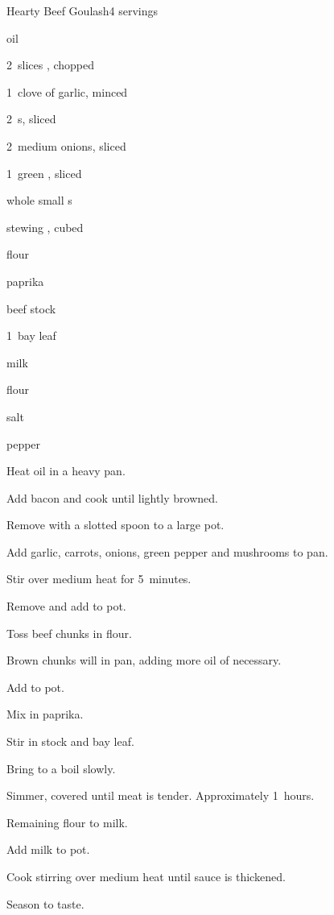 \begin{recipe}{Hearty Beef Goulash}{}{4 servings}

\begin{ingredients}
\item {} oil
\item 2~slices , chopped 
\item 1~clove of garlic, minced 
\item 2~s, sliced 
\item 2~medium onions, sliced 
\item 1~green , sliced 
\item \lbs{\quarter} whole small s
\item \lbs{1\half} stewing , cubed 
\item \C{\quarter} flour
\item {} paprika
\item {} beef stock
\item 1~bay leaf
\item {} milk
\item {} flour
\item salt
\item pepper
\end{ingredients}

\begin{directions}
\item Heat oil in a heavy pan.
\item Add bacon and cook until lightly browned.
\item Remove with a slotted spoon to a large pot.
\item Add garlic, carrots, onions, green pepper and mushrooms to pan.
\item Stir over medium heat for 5~minutes.
\item Remove and add to pot.
\item Toss beef chunks in flour.
\item Brown chunks will in pan, adding more oil of necessary.
\item Add to pot.
\item Mix in paprika.
\item Stir in stock and bay leaf.
\item Bring to a boil slowly.
\item Simmer, covered until meat is tender. Approximately 1\half~hours.
\item Remaining flour to milk.
\item Add milk to pot.
\item Cook stirring over medium heat until sauce is thickened.
\item Season to taste.
\end{directions}

\end{recipe}
